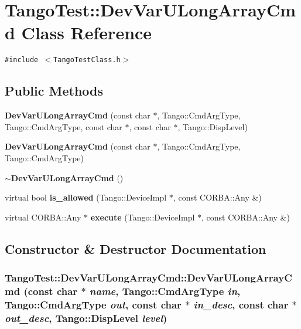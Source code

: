 \section{Tango\-Test::Dev\-Var\-ULong\-Array\-Cmd  Class Reference}
\label{classTangoTest_1_1DevVarULongArrayCmd}
{\tt \#include $<$Tango\-Test\-Class.h$>$}

\subsection*{Public Methods}
\begin{CompactItemize}
\item 
{\bf Dev\-Var\-ULong\-Array\-Cmd} (const char $\ast$, Tango::Cmd\-Arg\-Type, Tango::Cmd\-Arg\-Type, const char $\ast$, const char $\ast$, Tango::Disp\-Level)
\item 
{\bf Dev\-Var\-ULong\-Array\-Cmd} (const char $\ast$, Tango::Cmd\-Arg\-Type, Tango::Cmd\-Arg\-Type)
\item 
{\bf $\sim$Dev\-Var\-ULong\-Array\-Cmd} ()
\item 
virtual bool {\bf is\_\-allowed} (Tango::Device\-Impl $\ast$, const CORBA::Any \&)
\item 
virtual CORBA::Any $\ast$ {\bf execute} (Tango::Device\-Impl $\ast$, const CORBA::Any \&)
\end{CompactItemize}


\subsection{Constructor \& Destructor Documentation}
\subsubsection{\setlength{\rightskip}{0pt plus 5cm}Tango\-Test::Dev\-Var\-ULong\-Array\-Cmd::Dev\-Var\-ULong\-Array\-Cmd (const char $\ast$ {\em name}, Tango::Cmd\-Arg\-Type {\em in}, Tango::Cmd\-Arg\-Type {\em out}, const char $\ast$ {\em in\_\-desc}, const char $\ast$ {\em out\_\-desc}, Tango::Disp\-Level {\em level})}\label{classTangoTest_1_1DevVarULongArrayCmd_a0}


